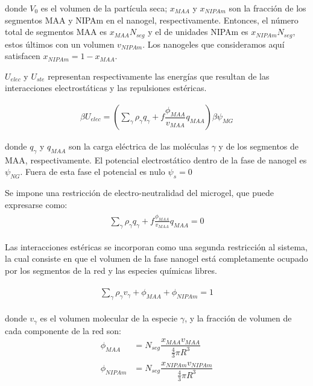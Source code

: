 	
	\noindent donde $V_0$ es el volumen de la part\'icula seca; $x_{MAA}$ y $x_{NIPAm}$ son la fracci\'on de los segmentos MAA y NIPAm en el nanogel, respectivamente.
	Entonces, el n\'umero total de segmentos MAA es $x_{MAA}N_{seg}$ y el de unidades NIPAm es $x_{NIPAm}N_{seg}$, estos \'ultimos con un volumen $v_{NIPAm}$.
	Los nanogeles que consideramos aqu\'i satisfacen $x_{NIPAm}=1-x_{MAA}$.
	
	
	$U_{elec}$ y $U_{ste}$ representan respectivamente las energ\'ias que resultan de las interacciones electrost\'aticas y las repulsiones est\'ericas.
	
	\begin{align}
		\beta U_{elec} =\left(\sum_{\gamma } {\rho_\gamma q_\gamma + f\dfrac{\phi_{MAA}}{v_{MAA}}q_{MAA}}\right)\beta\psi_{MG}
	\end{align}
	
	\noindent donde $q_\gamma$ y $q_{MAA}$ son la carga el\'ectrica de las moléculas $\gamma$ y de los segmentos de MAA, respectivamente.
	El potencial electrost\'atico dentro de la fase de nanogel es $\psi_{NG}$. Fuera de esta fase el potencial es nulo $\psi_s = 0$
	
	Se impone una restricci\'on de electro-neutralidad del microgel, que puede expresarse como:
	\begin{align}
		\begin{aligned}
			\sum_{\gamma  } \rho_\gamma q_\gamma + f\frac{\phi_{MAA}}{v_{MAA}}q_{MAA}=0
		\end{aligned}
		\label{eq:mc:charge-neutrality}
	\end{align}
	
	Las interacciones est\'ericas se incorporan como una segunda restricci\'on al sistema, la cual consiste en que el volumen de la fase nanogel est\'a completamente ocupado por los segmentos de la red y las especies qu\'imicas libres.
	
	\begin{align}
		\begin{aligned}
			\sum_{\gamma } \rho_\gamma v_\gamma  + \phi_{MAA} + \phi_{NIPAm} = 1
		\end{aligned}
		\label{eq:mc:packing}
	\end{align}
	
	
	\noindent donde $v_\gamma$  es el volumen molecular de la especie $\gamma$, y la fracci\'on de volumen de cada componente de la red son: 
	\begin{align}
		\phi_{MAA}&=N_{seg}\dfrac{x_{MAA}v_{MAA}}{\frac{4}{3}\pi R^3}\\
		\phi_{NIPAm}&=N_{seg}\dfrac{x_{NIPAm}v_{NIPAm}}{\frac{4}{3}\pi R^3}
	\end{align}
	
